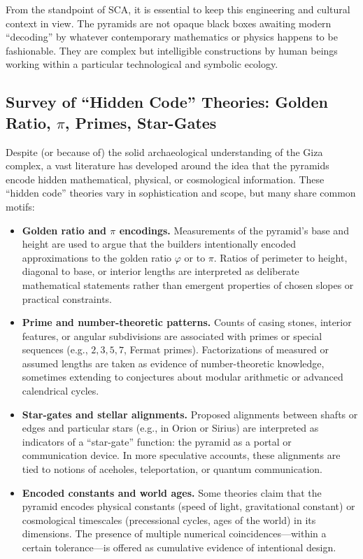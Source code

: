 \documentclass[12]{amsart}
\theoremstyle{plain}
\begin{document}
From the standpoint of SCA, it is essential to keep this engineering and cultural context in view. The pyramids are not opaque black boxes awaiting modern ``decoding'' by whatever contemporary mathematics or physics happens to be fashionable. They are complex but intelligible constructions by human beings working within a particular technological and symbolic ecology.

\subsection{Survey of ``Hidden Code'' Theories: Golden Ratio, $\pi$, Primes, Star-Gates}

Despite (or because of) the solid archaeological understanding of the Giza complex, a vast literature has developed around the idea that the pyramids encode hidden mathematical, physical, or cosmological information. These ``hidden code'' theories vary in sophistication and scope, but many share common motifs:

\begin{itemize}
  \item \textbf{Golden ratio and $\pi$ encodings.} Measurements of the pyramid's base and height are used to argue that the builders intentionally encoded approximations to the golden ratio $\varphi$ or to $\pi$. Ratios of perimeter to height, diagonal to base, or interior lengths are interpreted as deliberate mathematical statements rather than emergent properties of chosen slopes or practical constraints.
  \item \textbf{Prime and number-theoretic patterns.} Counts of casing stones, interior features, or angular subdivisions are associated with primes or special sequences (e.g., $2,3,5,7$, Fermat primes). Factorizations of measured or assumed lengths are taken as evidence of number-theoretic knowledge, sometimes extending to conjectures about modular arithmetic or advanced calendrical cycles.
  \item \textbf{Star-gates and stellar alignments.} Proposed alignments between shafts or edges and particular stars (e.g., in Orion or Sirius) are interpreted as indicators of a ``star-gate'' function: the pyramid as a portal or communication device. In more speculative accounts, these alignments are tied to notions of aceholes, teleportation, or quantum communication.
  \item \textbf{Encoded constants and world ages.} Some theories claim that the pyramid encodes physical constants (speed of light, gravitational constant) or cosmological timescales (precessional cycles, ages of the world) in its dimensions. The presence of multiple numerical coincidences---within a certain tolerance---is offered as cumulative evidence of intentional design.
\end{itemize}
\end{document}

